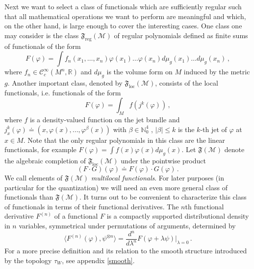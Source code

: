 \documentclass[11pt]{article}
\newcommand{\F}{\mathfrak{F}}
\newcommand{\Mcal}{\mathcal{M}}
\newcommand{\loc}{\mathrm{loc}}
\newcommand{\reg}{\mathrm{reg}}
\newcommand{\NN}{\mathbb{N}}          %
\newcommand{\ph}{\varphi}
\newcommand{\1}{\mathds{1}}                         %
\newcommand{\be}{\begin{equation}}
\newcommand{\ee}{\end{equation}}
\begin{document}
{Next we want to select a class of functionals which are sufficiently regular such that all mathematical operations we want to perform are meaningful and which, on the other hand, is large enough to cover the interesting cases. One class one may consider is the class $\F_\reg(\Mcal)$ of regular polynomials defined as finite sums of functionals of the form
\be
F(\ph)=\int f_n(x_1,\dots,x_n)\ph(x_1)\dots\ph(x_n)d\mu_g(x_1)\ldots d\mu_g(x_n)\,,
\ee
where $f_n\in\mathcal{C}^{\infty}_c(M^n,\mathbb{R})$ and $d\mu_g$ is the volume form on $M$ induced by the metric $g$. Another important class, denoted by $\F_\loc(\Mcal)$, consists of the local functionals, i.e. functionals of the form
\be
F(\ph)=\int_M f(j^k(\ph))\,,
\ee
where $f$ is a density-valued function on the jet bundle and $j_x^k(\ph)\doteq(x,\ph(x),...,\ph^{\beta}(x))$ with  $\beta\in\NN_0^4$ , $|\beta|\leq k$ is the $k$-th jet of $\ph$ at $x\in M$. Note that the only regular polynomials in this class are the linear functionals, for example $F(\ph)=\int f(x)\ph(x)d\mu_g(x)$. Let $\F(\Mcal)$ denote the algebraic completion of   $\F_\loc(\Mcal)$ under the pointwise product
\be\label{pointwise}
(F\cdot G)(\ph)\doteq F(\ph)\cdot G(\ph)\,.
\ee
We call elements of $\F(\Mcal)$ \textit{multilocal functionals}. For later purposes (in particular for the quantization) we will need an even more general class of functionals than $\F(\Mcal)$. It turns out to be convenient to characterize this class of functionals in terms of their functional derivatives. The $n$th functional derivative $F^{(n)}$ of a functional $F$ is  
a compactly supported distributional density in $n$ variables, symmetrical under permutations of arguments, determined by
\[\langle F^{(n)}(\ph),\psi^{\otimes n}\rangle=\frac{d^n}{d\lambda^n}F(\ph+\lambda\psi)|_{\lambda=0}\,.\]
For a more precise definition and its relation to the smooth structure introduced by the topology $\tau_W$, see appendix \ref{smooth}.

}
\end{document}
